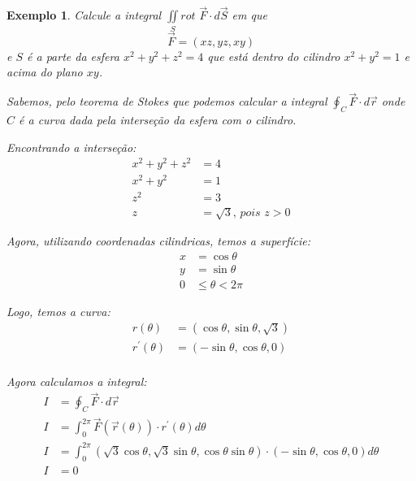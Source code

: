 \documentclass{article}
\newcommand{\doubleint}[2] {\iint\limits_{#1} #2}
\newcommand{\Rot}[0] {\textit{rot }}
\newtheorem{example}{Exemplo}[section]
\begin{document}
            \begin{example}
                Calcule a integral $\doubleint{S} \Rot \vec{F} \cdot d\vec{S}$ em que
                \[
                    \vec{F} = (xz, yz, xy)
                \]
                e $S$ é a parte da esfera $x^2 + y^2 + z^2 = 4$ que está dentro do cilindro $x^2 + y^2 = 1$
                e acima do plano $xy$.

                Sabemos, pelo teorema de Stokes que podemos calcular a integral $\oint_C \vec{F} \cdot d\vec{r}$
                onde $C$ é a curva dada pela interseção da esfera com o cilindro.

                Encontrando a interseção:
                \begin{align*}
                    x^2 + y^2 + z^2 &= 4\\
                    x^2 + y^2 &= 1\\
                    z^2 &= 3\\
                    z &= \sqrt{3} \textit{, pois } z > 0
                \end{align*}

                Agora, utilizando coordenadas cilindricas, temos a superfície:
                \begin{align*}
                    x &= \cos\theta\\
                    y &= \sin\theta\\
                    0 &\leq \theta < 2\pi
                \end{align*}

                Logo, temos a curva:
                \begin{align*}
                    r(\theta) &= (\cos\theta, \sin\theta, \sqrt{3})\\
                    r^\prime(\theta) &= (-\sin\theta, \cos\theta, 0)\\
                \end{align*}

                Agora calculamos a integral:
                \begin{align*}
                    I &= \oint_C \vec{F} \cdot d\vec{r}\\
                    I &= \int_0^{2\pi} \vec{F}(\vec{r}(\theta)) \cdot r^\prime(\theta) d\theta\\
                    I &= \int_0^{2\pi} (\sqrt{3}\cos\theta, \sqrt{3}\sin\theta, \cos\theta\sin\theta) \cdot
                         (-\sin\theta, \cos\theta, 0) d\theta\\
                    I &= 0
                \end{align*}
            \end{example}
\end{document}
